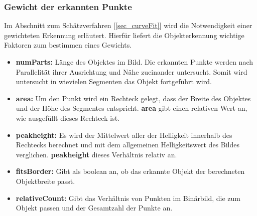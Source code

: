 \subsubsection*{Gewicht der erkannten Punkte}
\label{sec_weights}
Im Abschnitt zum Schätzverfahren [\ref{sec_curveFit}] wird die Notwendigkeit einer gewichteten Erkennung erläutert. Hierfür liefert die Objekterkennung wichtige Faktoren zum bestimmen eines Gewichts.\\
\begin{itemize}
\item \textbf{numParts:} Länge des Objektes im Bild. Die erkannten Punkte werden nach Parallelität ihrer Ausrichtung und Nähe zueinander untersucht. Somit wird untersucht in wievielen Segmenten das Objekt fortgeführt wird.
\item \textbf{area:} Um den Punkt wird ein Rechteck gelegt, dass der Breite des Objektes und der Höhe des Segmentes entspricht. \textbf{area} gibt einen relativen Wert an, wie ausgefüllt dieses Rechteck ist.
\item \textbf{peakheight:} Es wird der Mittelwert aller der Helligkeit innerhalb des Rechtecks berechnet und mit dem allgemeinen Helligkeitswert des Bildes verglichen. \textbf{peakheight} dieses Verhältnis relativ an.
\item \textbf{fitsBorder:} Gibt als boolean an, ob das erkannte Objekt der berechneten Objektbreite passt.
\item \textbf{relativeCount:} Gibt das Verhältnis von Punkten im Binärbild, die zum Objekt passen und der Gesamtzahl der Punkte an.
\end{itemize}